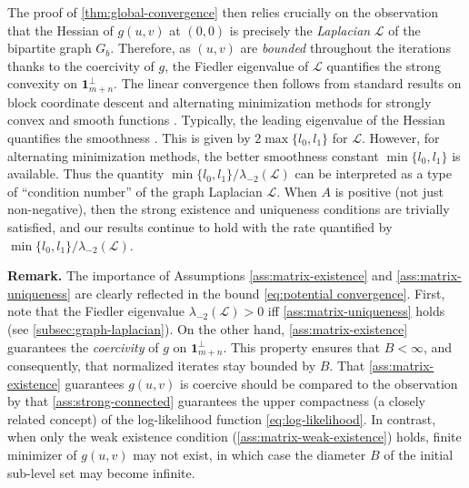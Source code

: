 The proof of \cref{thm:global-convergence} then relies crucially on the observation that the Hessian of $g(u,v)$ at $(0,0)$ is precisely the \emph{Laplacian} $\mathcal{L}$ of the bipartite graph $G_b$. Therefore, as $(u,v)$ are \emph{bounded} throughout the iterations thanks to the coercivity of $g$, the Fiedler eigenvalue of $\mathcal{L}$ quantifies the strong convexity on $\mathbf{1}_{m+n}^\perp$. The linear convergence then follows from standard results on block coordinate descent and alternating minimization methods for strongly convex and smooth functions \citep{beck2013convergence}. Typically, the leading eigenvalue of the Hessian quantifies the smoothness \citep{luenberger1984linear}. This is given by $2\max\{l_0,l_1\}$ for $\mathcal{L}$. However, for alternating minimization methods, the better smoothness constant $\min\{l_0,l_1\}$ is available. Thus the quantity $\min\{l_{0},l_{1}\}/\lambda_{-2}(\mathcal{L})$ can be interpreted as a type of  ``condition number'' of the graph Laplacian $\mathcal{L}$. When $A$ is positive (not just non-negative), then the strong existence and uniqueness conditions are trivially satisfied, and our results continue to hold with the rate quantified by $\min\{l_{0},l_{1}\}/\lambda_{-2}(\mathcal{L})$.

\textbf{Remark.} The importance of Assumptions \ref{ass:matrix-existence} and \ref{ass:matrix-uniqueness} are clearly reflected in the bound \eqref{eq:potential convergence}.
First, note that the Fiedler eigenvalue $\lambda_{-2}(\mathcal{L})>0$ iff \cref{ass:matrix-uniqueness} holds (see \cref{subsec:graph-laplacian}). On the other hand, \cref{ass:matrix-existence} guarantees the \emph{coercivity} of $g$ on $\mathbf{1}_{m+n}^\perp$. This property ensures that $B<\infty$, and consequently, that normalized iterates stay bounded by $B$. That \cref{ass:matrix-existence} guarantees  $g(u,v)$ is coercive should be compared to the observation by \citet{hunter2004mm} that \cref{ass:strong-connected} guarantees the upper compactness (a closely related concept) of the log-likelihood function \eqref{eq:log-likelihood}.
In contrast, when only the weak existence condition (\cref{ass:matrix-weak-existence}) holds, finite minimizer of $g(u,v)$ may not exist, in which case the diameter $B$ of the initial sub-level set may become infinite.

